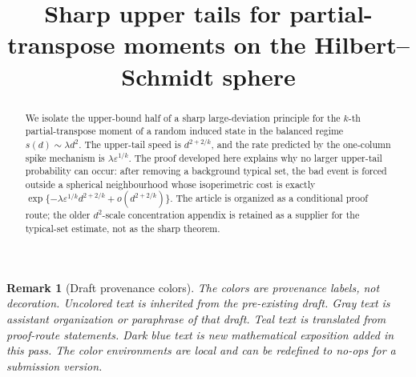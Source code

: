 \documentclass[11pt,reqno]{amsart}
\title[Sharp upper tails for PPT moments]{Sharp upper tails for partial-transpose moments on the Hilbert--Schmidt sphere}
\author{}
\date{}
\newtheorem{remark}[theorem]{Remark}
\newenvironment{revverified}{\begingroup\color{RevisionVerified}}{\endgroup}
\newenvironment{revnewmath}{\begingroup\color{RevisionNewMath}}{\endgroup}
\begin{document}
\begin{revverified}
\begin{abstract}
We isolate the upper-bound half of a sharp large-deviation principle for the
\(k\)-th partial-transpose moment of a random induced state in the balanced
regime \(s(d)\sim \lambda d^2\).  The upper-tail speed is
\(d^{2+2/k}\), and the rate predicted by the one-column spike mechanism is
\(\lambda\varepsilon^{1/k}\).  The proof developed here explains why no
larger upper-tail probability can occur: after removing a background typical
set, the bad event is forced outside a spherical neighbourhood whose
isoperimetric cost is exactly
\(\exp\{-\lambda\varepsilon^{1/k}d^{2+2/k}+o(d^{2+2/k})\}\).
The article is organized as a conditional proof route; the older
\(d^2\)-scale concentration appendix is retained as a supplier for the
typical-set estimate, not as the sharp theorem.
\end{abstract}
\end{revverified}

\maketitle

\begin{revnewmath}
\begin{remark}[Draft provenance colors]
The colors are provenance labels, not decoration.  Uncolored text is inherited
from the pre-existing draft.  Gray text is assistant organization or paraphrase
of that draft.  Teal text is translated from proof-route statements.  Dark blue text is new mathematical exposition added in
this pass.  The color environments are local and can be redefined to no-ops
for a submission version.
\end{remark}
\end{revnewmath}
\end{document}
